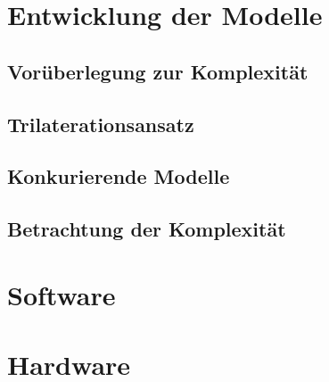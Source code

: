 
\section{Entwicklung der Modelle}
\lipsum[1-3]

\subsection{Vorüberlegung zur Komplexität}
\label{sec:Komplexity1}

\subsection{Trilaterationsansatz}
%
\lipsum[1-1]

\subsection{Konkurierende Modelle}
\lipsum[1-1]

\subsection{Betrachtung der Komplexität}
\label{sec:Komplexity2}

\section{Software}
\lipsum[1-3]

\section{Hardware}
\lipsum[1-3]
